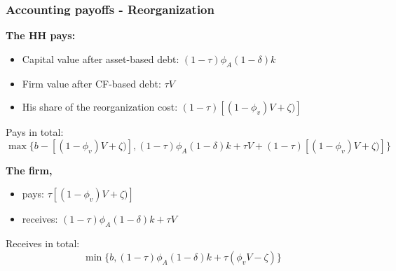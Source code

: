 \documentclass[notes]{beamer}
\begin{document}
\begin{frame}\frametitle{Accounting payoffs - Reorganization}
\textbf{The HH pays: }
\begin{itemize} \setlength\itemsep{0em}
    \item Capital value after asset-based debt: $(1-\tau)\phi_A(1-\delta)k$
    \item Firm value after CF-based debt: $\tau V$
    \item His share of the reorganization cost: $ (1-\tau) [(1- \phi_v) V + \zeta)]$ 
\end{itemize}
Pays in total: $$ \max \{b - [(1- \phi_v) V + \zeta)], (1-\tau)\phi_A(1-\delta)k + \tau V + (1-\tau) [(1- \phi_v) V + \zeta)]\}  $$

\textbf{The firm,}
\begin{itemize} \setlength\itemsep{0em}
    \item pays:  $ \tau [(1- \phi_v) V + \zeta)]$
    \item receives: $(1-\tau)\phi_A(1-\delta)k + \tau V $
\end{itemize}
Receives in total: $$ \min \{b , (1-\tau)\phi_A(1-\delta)k + \tau (\phi_v V - \zeta) \}  $$

\end{frame}
\end{document}
